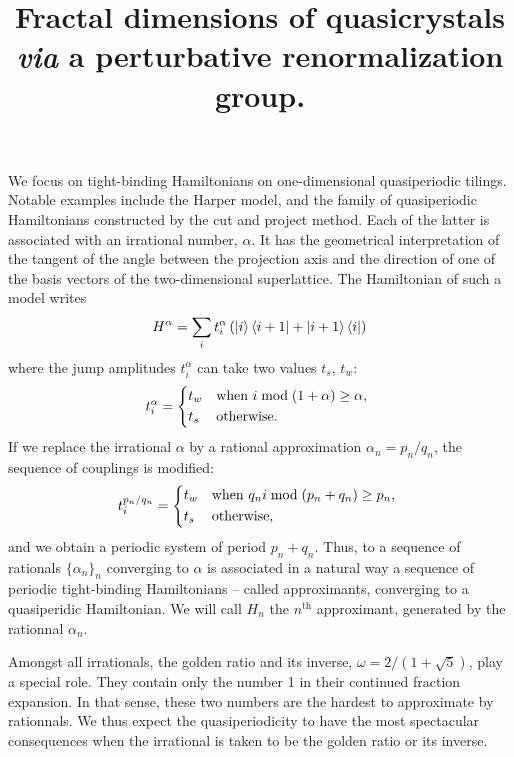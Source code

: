 \documentclass[11pt]{article}
\title{\textbf{Fractal dimensions of quasicrystals \emph{via} a perturbative renormalization group.}}
\author{}
\date{}
\begin{document}

\maketitle


We focus on tight-binding Hamiltonians on one-dimensional quasiperiodic tilings.
Notable examples include the Harper model, and the family of quasiperiodic Hamiltonians constructed by the cut and project method. 
Each of the latter is associated with an irrational number, $\alpha$.
It has the geometrical interpretation of the tangent of the angle between the projection axis and the direction of one of the basis vectors of the two-dimensional superlattice.
The Hamiltonian of such a model writes
\begin{equation}
	H^\alpha = \sum_i t^\alpha_i \left( \ket{i} \bra{i+1} + \ket{i+1} \bra{i} \right)
\end{equation}
where the jump amplitudes $t^\alpha_i$ can take two values $t_s$, $t_w$:
\begin{equation}
	t_i^\alpha = \begin{dcases*}
	t_w & when $i \bmod(1+\alpha) \geq \alpha$, \\
	t_s & otherwise.
	\end{dcases*}
\end{equation}
If we replace the irrational $\alpha$ by a rational approximation $\alpha_n = p_n/q_n$, the sequence of couplings is modified:
\begin{equation}
	t_i^{p_n/q_n} = \begin{dcases*}
	t_w & when $q_n i \bmod(p_n+q_n) \geq p_n$, \\
	t_s & otherwise,
	\end{dcases*}
\end{equation}
and we obtain a periodic system of period $p_n + q_n$. 
Thus, to a sequence of rationals $\{\alpha_n\}_n$ converging to $\alpha$ is associated in a natural way a sequence of periodic tight-binding Hamiltonians -- called approximants, converging to a quasiperidic Hamiltonian. We will call $H_n$ the $n^\text{th}$ approximant, generated by the rationnal $\alpha_n$.


Amongst all irrationals, the golden ratio and its inverse, $\omega = 2/(1+\sqrt{5})$, play a special role. They contain only the number 1 in their continued fraction expansion. In that sense, these two numbers are the hardest to approximate by rationnals. 
We thus expect the quasiperiodicity to have the most spectacular consequences when the irrational is taken to be the golden ratio or its inverse.
\end{document}
